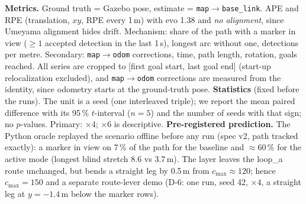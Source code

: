 \documentclass[10pt,twocolumn]{article}
\begin{document}
\textbf{Metrics.} Ground truth = Gazebo pose, estimate = \texttt{map}$\to$\texttt{base\_link}. APE and RPE (translation, $xy$, RPE every 1\,m) with evo 1.38 and \emph{no alignment}, since Umeyama alignment hides drift.
Mechanism: share of the path with a marker in view ($\ge1$ accepted detection in the last 1\,s), longest arc without one, detections per metre. Secondary: \texttt{map}$\to$\texttt{odom} corrections, time, path length, rotation, goals reached.
All series are cropped to [first goal start, last goal end] (start-up relocalization excluded), and \texttt{map}$\to$\texttt{odom} corrections are measured from the identity, since odometry starts at the ground-truth pose.
\textbf{Statistics} (fixed before the runs). The unit is a seed (one interleaved triple); we report the mean paired difference with its 95\,\% $t$-interval ($n=5$) and the number of seeds with that sign; no $p$-values. Primary: ${\times}4$; ${\times}6$ is descriptive.
\textbf{Pre-registered prediction.} The Python oracle replayed the scenario offline before any run (spec v2, path tracked exactly): a marker in view on 7\,\% of the path for the baseline and $\approx$60\,\% for the active mode (longest blind stretch 8.6 vs 3.7\,m). The layer leaves the loop\_a route unchanged, but bends a straight leg by 0.5\,m from $c_{\max}\approx120$; hence $c_{\max}=150$ and a separate route-lever demo (D-6: one run, seed 42, ${\times}4$, a straight leg at $y=-1.4$\,m below the marker rows).
\end{document}
